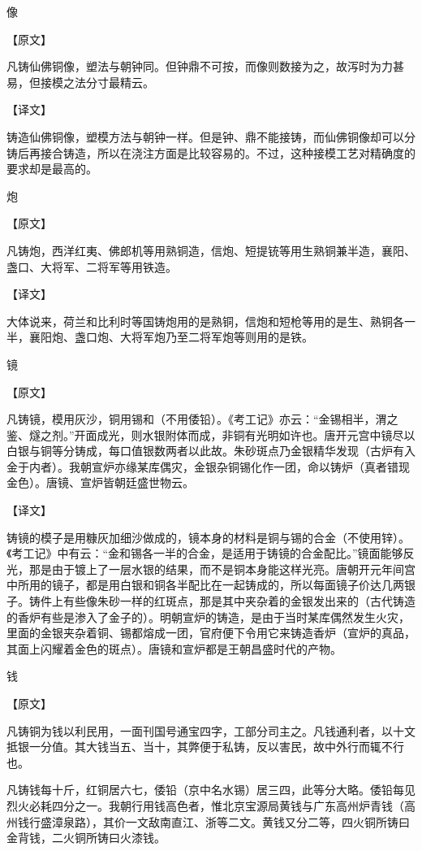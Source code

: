 \documentclass[12pt,UTF8]{ctexbook}
\begin{document}
像

【原文】

凡铸仙佛铜像，塑法与朝钟同。但钟鼎不可按，而像则数接为之，故泻时为力甚易，但接模之法分寸最精云。

【译文】

铸造仙佛铜像，塑模方法与朝钟一样。但是钟、鼎不能接铸，而仙佛铜像却可以分铸后再接合铸造，所以在浇注方面是比较容易的。不过，这种接模工艺对精确度的要求却是最高的。

炮

【原文】

凡铸炮，西洋红夷、佛郎机等用熟铜造，信炮、短提铳等用生熟铜兼半造，襄阳、盏口、大将军、二将军等用铁造。

【译文】

大体说来，荷兰和比利时等国铸炮用的是熟铜，信炮和短枪等用的是生、熟铜各一半，襄阳炮、盏口炮、大将军炮乃至二将军炮等则用的是铁。

镜

【原文】

凡铸镜，模用灰沙，铜用锡和（不用倭铅）。《考工记》亦云：“金锡相半，渭之鉴、燧之剂。”开面成光，则水银附体而成，非铜有光明如许也。唐开元宫中镜尽以白银与铜等分铸成，每口值银数两者以此故。朱砂斑点乃金银精华发现（古炉有入金于内者）。我朝宣炉亦缘某库偶灾，金银杂铜锡化作一团，命以铸炉（真者错现金色）。唐镜、宣炉皆朝廷盛世物云。

【译文】

铸镜的模子是用糠灰加细沙做成的，镜本身的材料是铜与锡的合金（不使用锌）。《考工记》中有云：“金和锡各一半的合金，是适用于铸镜的合金配比。”镜面能够反光，那是由于镀上了一层水银的结果，而不是铜本身能这样光亮。唐朝开元年间宫中所用的镜子，都是用白银和铜各半配比在一起铸成的，所以每面镜子价达几两银子。铸件上有些像朱砂一样的红斑点，那是其中夹杂着的金银发出来的（古代铸造的香炉有些是渗入了金子的）。明朝宣炉的铸造，是由于当时某库偶然发生火灾，里面的金银夹杂着铜、锡都熔成一团，官府便下令用它来铸造香炉（宣炉的真品，其面上闪耀着金色的斑点）。唐镜和宣炉都是王朝昌盛时代的产物。

钱

【原文】

凡铸铜为钱以利民用，一面刊国号通宝四字，工部分司主之。凡钱通利者，以十文抵银一分值。其大钱当五、当十，其弊便于私铸，反以害民，故中外行而辄不行也。

凡铸钱每十斤，红铜居六七，倭铅（京中名水锡）居三四，此等分大略。倭铅每见烈火必耗四分之一。我朝行用钱高色者，惟北京宝源局黄钱与广东高州炉青钱（高州钱行盛漳泉路），其价一文敌南直江、浙等二文。黄钱又分二等，四火铜所铸曰金背钱，二火铜所铸曰火漆钱。
\end{document}
